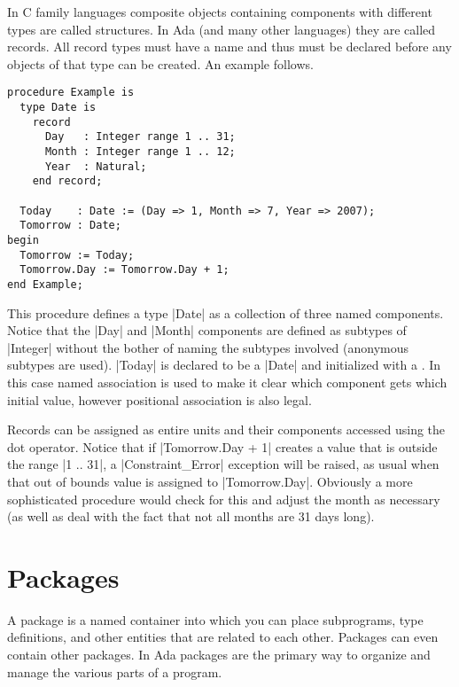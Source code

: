 In C family languages composite objects containing components with different types are called
structures. In Ada (and many other languages) they are called records. All record types must
have a name and thus must be declared before any objects of that type can be created. An example
follows.

\begin{lstlisting}
procedure Example is
  type Date is
    record
      Day   : Integer range 1 .. 31;
      Month : Integer range 1 .. 12;
      Year  : Natural;
    end record;

  Today    : Date := (Day => 1, Month => 7, Year => 2007);
  Tomorrow : Date;
begin
  Tomorrow := Today;
  Tomorrow.Day := Tomorrow.Day + 1;
end Example;
\end{lstlisting}

This procedure defines a type |Date| as a collection of three named components. Notice that the
|Day| and |Month| components are defined as subtypes of |Integer| without the bother of naming
the subtypes involved (anonymous subtypes are used). |Today| is declared to be a |Date| and
initialized with a . In this case named association is used to make it
clear which component gets which initial value, however positional association is also legal.

Records can be assigned as entire units and their components accessed using the dot operator.
Notice that if |Tomorrow.Day + 1| creates a value that is outside the range |1 .. 31|, a
|Constraint_Error| exception will be raised, as usual when that out of bounds value is assigned
to |Tomorrow.Day|. Obviously a more sophisticated procedure would check for this and adjust the
month as necessary (as well as deal with the fact that not all months are 31 days long).

\section{Packages}
\label{sec:packages}

A package is a named container into which you can place subprograms, type definitions, and other
entities that are related to each other. Packages can even contain other packages. In Ada
packages are the primary way to organize and manage the various parts of a program.

